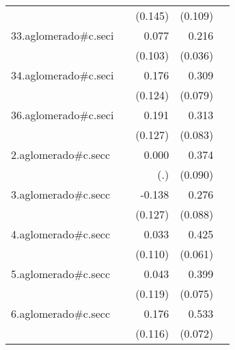 {\begin{longtable}{l*{4}{D{.}{.}{-1}}}
            &                     &     (0.145)         &     (0.109)         &                     \\
\addlinespace
33.aglomerado#c.seci&                     &       0.077         &       0.216\sym{***}&                     \\
            &                     &     (0.103)         &     (0.036)         &                     \\
\addlinespace
34.aglomerado#c.seci&                     &       0.176         &       0.309\sym{***}&                     \\
            &                     &     (0.124)         &     (0.079)         &                     \\
\addlinespace
36.aglomerado#c.seci&                     &       0.191         &       0.313\sym{***}&                     \\
            &                     &     (0.127)         &     (0.083)         &                     \\
\addlinespace
2.aglomerado#c.secc&                     &       0.000         &       0.374\sym{***}&                     \\
            &                     &         (.)         &     (0.090)         &                     \\
\addlinespace
3.aglomerado#c.secc&                     &      -0.138         &       0.276\sym{**} &                     \\
            &                     &     (0.127)         &     (0.088)         &                     \\
\addlinespace
4.aglomerado#c.secc&                     &       0.033         &       0.425\sym{***}&                     \\
            &                     &     (0.110)         &     (0.061)         &                     \\
\addlinespace
5.aglomerado#c.secc&                     &       0.043         &       0.399\sym{***}&                     \\
            &                     &     (0.119)         &     (0.075)         &                     \\
\addlinespace
6.aglomerado#c.secc&                     &       0.176         &       0.533\sym{***}&                     \\
            &                     &     (0.116)         &     (0.072)         &                     \\

\end{longtable}}
